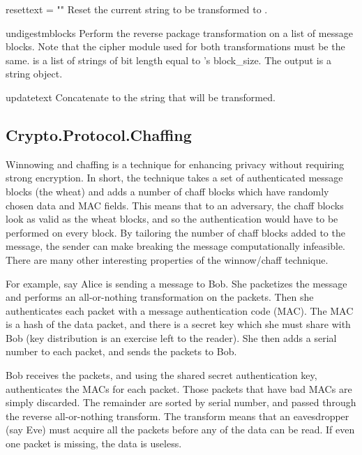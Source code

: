 \documentclass{howto}
\begin{document}
\begin{methoddesc}{reset}{text = ""}
Reset the current string to be transformed to .
\end{methoddesc}

\begin{methoddesc}{undigest}{mblocks}
Perform the reverse package transformation on a list of message
blocks.  Note that the cipher module used for both transformations
must be the same.   is a list of strings of bit length
equal to 's block_size.  The output is a string object.
\end{methoddesc}

\begin{methoddesc}{update}{text}
Concatenate  to the string that will be transformed.
\end{methoddesc}

\subsection{Crypto.Protocol.Chaffing}

Winnowing and chaffing is a technique for enhancing privacy without requiring
strong encryption.  In short, the technique takes a set of authenticated
message blocks (the wheat) and adds a number of chaff blocks which have
randomly chosen data and MAC fields.  This means that to an adversary, the
chaff blocks look as valid as the wheat blocks, and so the authentication
would have to be performed on every block.  By tailoring the number of chaff
blocks added to the message, the sender can make breaking the message
computationally infeasible.  There are many other interesting properties of
the winnow/chaff technique.

For example, say Alice is sending a message to Bob.  She packetizes the
message and performs an all-or-nothing transformation on the packets.  Then
she authenticates each packet with a message authentication code (MAC).  The
MAC is a hash of the data packet, and there is a secret key which she must
share with Bob (key distribution is an exercise left to the reader).  She then
adds a serial number to each packet, and sends the packets to Bob.

Bob receives the packets, and using the shared secret authentication key,
authenticates the MACs for each packet.  Those packets that have bad MACs are
simply discarded.  The remainder are sorted by serial number, and passed
through the reverse all-or-nothing transform.  The transform means that an
eavesdropper (say Eve) must acquire all the packets before any of the data can
be read.  If even one packet is missing, the data is useless.
\end{document}
